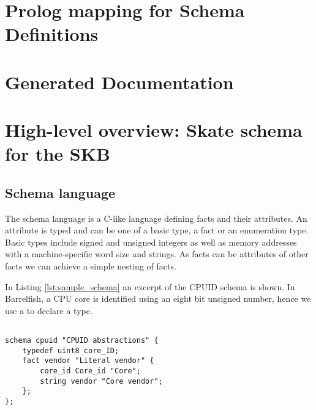 \documentclass[a4paper,11pt,twoside]{report}
\begin{document}
{{


\chapter{Prolog mapping for Schema Definitions}
\label{chap:prologmapping}

\chapter{Generated Documentation}
\label{chap:documentation}

\chapter{High-level overview: Skate schema for the SKB}
\label{chap:overview}



\section{Schema language}

The schema language is a C-like language defining facts and their attributes. An
attribute is typed and can be one of a basic type, a fact or an enumeration
type. Basic types include signed and unsigned integers as well as memory
addresses with a machine-specific word size and strings. As facts can be
attributes of other facts we can achieve a simple nesting of facts.

In Listing \ref{lst:sample_schema} an excerpt of the CPUID schema is shown. In
Barrelfish, a CPU core is identified using an eight bit unsigned number, hence
we use a  to declare a  type.

\begin{lstlisting}[caption={Sample Skate schema definition},
label={lst:sample_schema},language=Skate]

schema cpuid "CPUID abstractions" {
    typedef uint8 core_ID;
    fact vendor "Literal vendor" {
        core_id Core_id "Core";
        string vendor "Core vendor";
    };
};
\end{lstlisting}

}}
\end{document}
